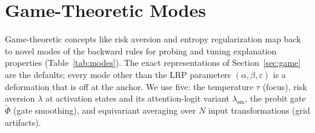 \documentclass[twoside]{article}
\newif\ifch \chfalse
\newcommand{\ch}[1]{\ifch\textcolor{magenta}{#1}\else#1\fi}
\newcommand{\1}{\mathbf{1}}
\begin{document}
\section{Game-Theoretic Modes}\label{sec:modes}\label{sec:controls}

Game-theoretic concepts like risk aversion and entropy regularization map back to novel modes of
the backward rules for probing and tuning explanation properties (Table~\ref{tab:modes}). The exact
representations of Section~\ref{sec:game} are the defaults; every mode other than the \ac{LRP}
parameters $(\alpha,\beta,\varepsilon)$ is a deformation that is off at the anchor.
\ch{We use five:
the temperature $\tau$ (focus), risk aversion $\lambda$ at activation states and its
attention-logit variant $\lambda_{\mathrm{sm}}$, the probit gate $\tilde\Phi$ (gate smoothing),
and equivariant averaging over $N$ input transformations (grid artifacts).}
\end{document}
